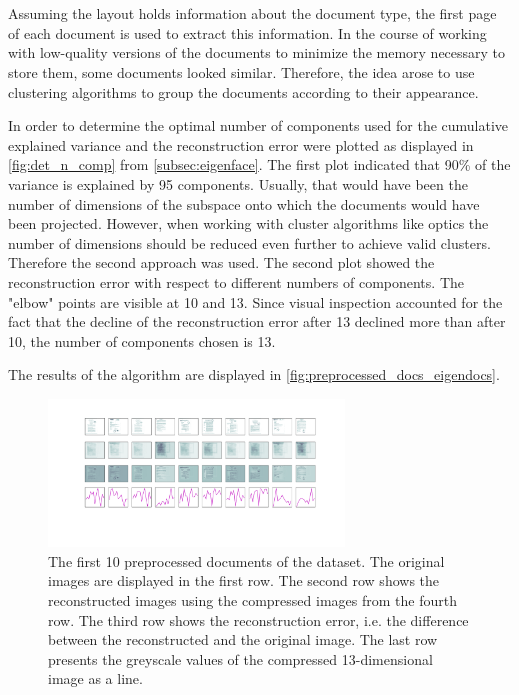 \section{\eigendocs{}}\label{sec:evaluation-eigendocs}
Assuming the layout holds information about the document type, the first page of each document is used to extract this information.
In the course of working with low-quality versions of the documents to minimize the memory necessary to store them, some documents looked similar.
Therefore, the idea arose to use clustering algorithms to group the documents according to their appearance.

In order to determine the optimal number of components used for \eigendocs{} the cumulative explained variance and the reconstruction error were plotted 
as displayed in \autoref{fig:det_n_comp} from \autoref{subsec:eigenface}.
The first plot indicated that 90\% of the variance is explained by 95 components.
Usually, that would have been the number of dimensions of the subspace onto which the documents would have been projected.
However, when working with cluster algorithms like \ac{optics} the number of dimensions should be reduced even further to achieve valid clusters.
Therefore the second approach was used.
The second plot showed the reconstruction error with respect to different numbers of components.
The "elbow" points are visible at 10 and 13.
Since visual inspection accounted for the fact that the decline of the reconstruction error after 13 declined more than after 10, the number of components chosen is 13.

The results of the \eigendocs{} algorithm are displayed in \autoref{fig:preprocessed_docs_eigendocs}.

\begin{figure}[htp] %
    \centering
    \includegraphics[width=0.7\textwidth]{images/Eigendocs/transformation/eigendocs_13dims.pdf}
    \caption[The first 10 documents of the dataset]{The first 10 preprocessed documents of the dataset.
    The original images are displayed in the first row.
    The second row shows the reconstructed images using the compressed images from the fourth row.
    The third row shows the reconstruction error, i.e. the difference between the reconstructed and the original image.
    The last row presents the greyscale values of the compressed 13-dimensional image as a line.
    }
    \label{fig:preprocessed_docs_eigendocs}
\end{figure}

